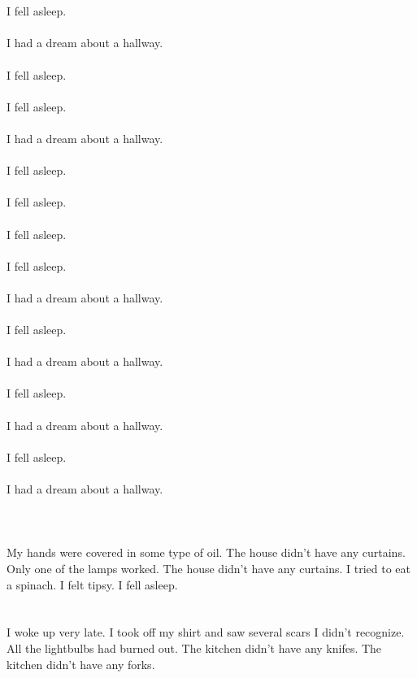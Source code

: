 \documentclass{article}
\begin{document}
    \section{}
    I fell asleep.\\\\I had a dream about a hallway.\\\\ I fell asleep.\\\\ I fell asleep.\\\\I had a dream about a hallway.\\\\ I fell asleep.\\\\ I fell asleep.\\\\ I fell asleep.\\\\ I fell asleep.\\\\I had a dream about a hallway.\\\\ I fell asleep.\\\\I had a dream about a hallway.\\\\ I fell asleep.\\\\I had a dream about a hallway.\\\\ I fell asleep.\\\\I had a dream about a hallway.\\\\ 
    \newpage
    
    \section{}
    My hands were covered in some type of oil. The house didn't have any curtains. Only one of the lamps worked. The house didn't have any curtains. I tried to eat a spinach. I felt tipsy. I fell asleep.  
    \newpage
    
    \section{}
    I woke up very late. I took off my shirt and saw several scars I didn't recognize. All the lightbulbs had burned out. The kitchen didn't have any knifes. The kitchen didn't have any forks.  
    \newpage
    
\end{document}
